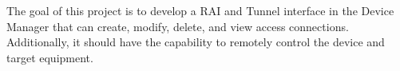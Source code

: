 
The goal of this project is to develop a RAI and Tunnel interface 
in the Device Manager that can create, modify, delete, 
and view access connections. 
Additionally, it should have the capability 
to remotely control the device and target equipment.
